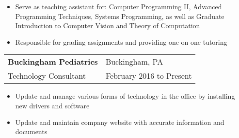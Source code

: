 \documentclass[10pt,]{article}
\let\oldparagraph\paragraph
\renewcommand{\paragraph}[1]{\oldparagraph{#1}\mbox{}}
\begin{document}
\begin{itemize}
	\setlength\itemsep{-1.75em}
	\item Serve as teaching assistant for: Computer Programming II, Advanced Programming Techniques, Systems Programming, as well as Graduate Introduction to Computer Vision and Theory of Computation\\
	\item Responsible for grading assignments and providing one-on-one tutoring\\
\end{itemize}
\vspace{-2mm}

\begin{tabularx}{\textwidth}{l X}
    \textbf{Buckingham Pediatrics} & \hfill Buckingham, PA\\
    Technology Consultant          & \hfill February 2016 to Present
\end{tabularx}

\begin{itemize}
	\setlength\itemsep{-0.75em}
    \item Update and manage various forms of technology in the office by installing new drivers and software
    \item Update and maintain company website with accurate information and documents
\end{itemize}

\vspace{-3mm}


\end{document}
